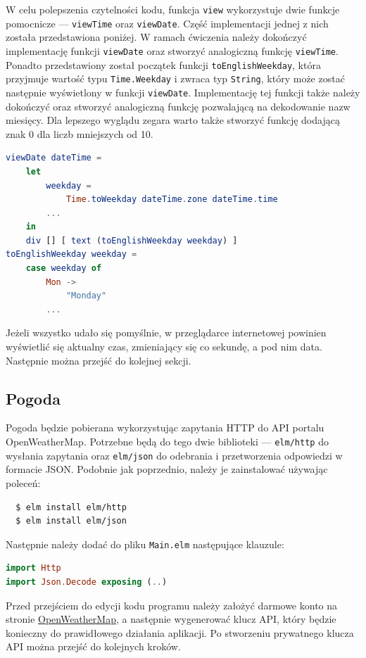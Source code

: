 \documentclass[twoside,a4paper]{report}
\begin{document}
W celu polepszenia czytelności kodu, funkcja \texttt{view} wykorzystuje dwie funkcje pomocnicze --- \texttt{viewTime} oraz \texttt{viewDate}.
Część implementacji jednej z nich została przedstawiona poniżej.
W ramach ćwiczenia należy dokończyć implementację funkcji \texttt{viewDate} oraz stworzyć analogiczną funkcję \texttt{viewTime}.
Ponadto przedstawiony został początek funkcji \texttt{toEnglishWeekday}, która przyjmuje wartość typu \texttt{Time.Weekday} i zwraca typ \texttt{String}, który może zostać następnie wyświetlony w funkcji \texttt{viewDate}.
Implementację tej funkcji także należy dokończyć oraz stworzyć analogiczną funkcję pozwalającą na dekodowanie nazw miesięcy.
Dla lepszego wyglądu zegara warto także stworzyć funkcję dodającą znak 0 dla liczb mniejszych od 10.
\begin{lstlisting}[language=Elm]
viewDate dateTime =
    let
        weekday =
            Time.toWeekday dateTime.zone dateTime.time
        ...
    in
    div [] [ text (toEnglishWeekday weekday) ]
toEnglishWeekday weekday =
    case weekday of
        Mon ->
            "Monday"
        ...
\end{lstlisting}

Jeżeli wszystko udało się pomyślnie, w przeglądarce internetowej powinien wyświetlić się aktualny czas, zmieniający się co sekundę, a pod nim data.
Następnie można przejść do kolejnej sekcji.

\subsection{Pogoda}
Pogoda będzie pobierana wykorzystując zapytania HTTP do API portalu OpenWeatherMap\@.
Potrzebne będą do tego dwie biblioteki --- \texttt{elm/http} do wysłania zapytania oraz \texttt{elm/json} do odebrania i przetworzenia odpowiedzi w formacie JSON\@.
Podobnie jak poprzednio, należy je zainstalować używając poleceń:
\begin{lstlisting}
  $ elm install elm/http
  $ elm install elm/json
\end{lstlisting}
Następnie należy dodać do pliku \texttt{Main.elm} następujące klauzule:

\begin{lstlisting}[language=Elm]
import Http
import Json.Decode exposing (..)
\end{lstlisting}

Przed przejściem do edycji kodu programu należy założyć darmowe konto na stronie \href{https://openweathermap.org/}{OpenWeatherMap}, a następnie wygenerować klucz API, który będzie konieczny do prawidłowego działania aplikacji.
Po stworzeniu prywatnego klucza API można przejść do kolejnych kroków.
\end{document}
